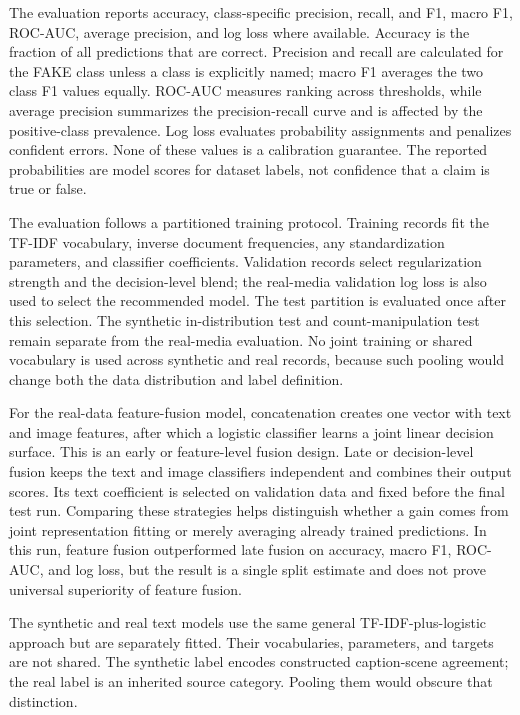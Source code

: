 \documentclass[conference]{IEEEtran}
\begin{document}
The evaluation reports accuracy, class-specific precision, recall, and F1, macro F1, ROC-AUC, average precision, and log loss where available. Accuracy is the fraction of all predictions that are correct. Precision and recall are calculated for the FAKE class unless a class is explicitly named; macro F1 averages the two class F1 values equally. ROC-AUC measures ranking across thresholds, while average precision summarizes the precision-recall curve and is affected by the positive-class prevalence. Log loss evaluates probability assignments and penalizes confident errors. None of these values is a calibration guarantee. The reported probabilities are model scores for dataset labels, not confidence that a claim is true or false.

The evaluation follows a partitioned training protocol. Training records fit the TF-IDF vocabulary, inverse document frequencies, any standardization parameters, and classifier coefficients. Validation records select regularization strength and the decision-level blend; the real-media validation log loss is also used to select the recommended model. The test partition is evaluated once after this selection. The synthetic in-distribution test and count-manipulation test remain separate from the real-media evaluation. No joint training or shared vocabulary is used across synthetic and real records, because such pooling would change both the data distribution and label definition.

For the real-data feature-fusion model, concatenation creates one vector with text and image features, after which a logistic classifier learns a joint linear decision surface. This is an early or feature-level fusion design. Late or decision-level fusion keeps the text and image classifiers independent and combines their output scores. Its text coefficient is selected on validation data and fixed before the final test run. Comparing these strategies helps distinguish whether a gain comes from joint representation fitting or merely averaging already trained predictions. In this run, feature fusion outperformed late fusion on accuracy, macro F1, ROC-AUC, and log loss, but the result is a single split estimate and does not prove universal superiority of feature fusion.

The synthetic and real text models use the same general TF-IDF-plus-logistic approach but are separately fitted. Their vocabularies, parameters, and targets are not shared. The synthetic label encodes constructed caption-scene agreement; the real label is an inherited source category. Pooling them would obscure that distinction.
\end{document}
